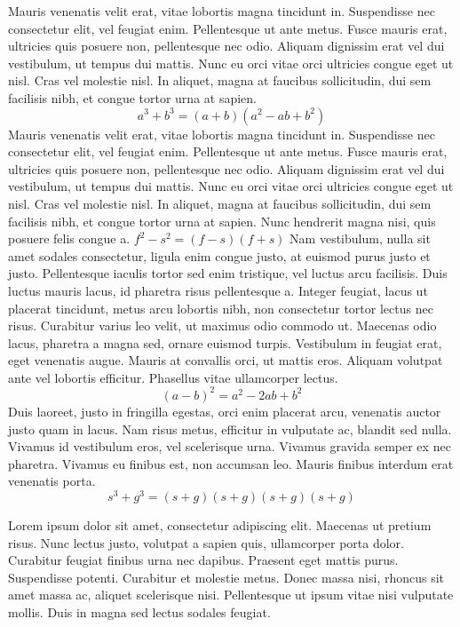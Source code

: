 \documentclass{article}
\begin{document}
Mauris venenatis velit erat, vitae lobortis magna tincidunt in. Suspendisse nec consectetur elit, vel feugiat enim. Pellentesque ut ante metus. Fusce mauris erat, ultricies quis posuere non, pellentesque nec odio. Aliquam dignissim erat vel dui vestibulum, ut tempus dui mattis. Nunc eu orci vitae orci ultricies congue eget ut nisl. Cras vel molestie nisl. In aliquet, magna at faucibus sollicitudin, dui sem facilisis nibh, et congue tortor urna at sapien.
\[ a^{3} + b^{3} = (a+b)(a^{2}-ab+b^{2}) \]
Mauris venenatis velit erat, vitae lobortis magna tincidunt in. Suspendisse nec consectetur elit, vel feugiat enim. Pellentesque ut ante metus. Fusce mauris erat, ultricies quis posuere non, pellentesque nec odio. Aliquam dignissim erat vel dui vestibulum, ut tempus dui mattis. Nunc eu orci vitae orci ultricies congue eget ut nisl. Cras vel molestie nisl. In aliquet, magna at faucibus sollicitudin, dui sem facilisis nibh, et congue tortor urna at sapien.
Nunc hendrerit magna nisi, quis posuere felis congue a.
\begin{math}
    f^{2}-s^{2} = (f - s)(f + s)
\end{math}
Nam vestibulum, nulla sit amet sodales consectetur, ligula enim congue justo, at euismod purus justo et justo. Pellentesque iaculis tortor sed enim tristique, vel luctus arcu facilisis. Duis luctus mauris lacus, id pharetra risus pellentesque a. Integer feugiat, lacus ut placerat tincidunt, metus arcu lobortis nibh, non consectetur tortor lectus nec risus. Curabitur varius leo velit, ut maximus odio commodo ut. Maecenas odio lacus, pharetra a magna sed, ornare euismod turpis. Vestibulum in feugiat erat, eget venenatis augue. Mauris at convallis orci, ut mattis eros. Aliquam volutpat ante vel lobortis efficitur. Phasellus vitae ullamcorper lectus.
\begin{equation}
(a-b)^{2}=a^{2}-2ab+b^{2} 
\end{equation}
Duis laoreet, justo in fringilla egestas, orci enim placerat arcu, venenatis auctor justo quam in lacus. Nam risus metus, efficitur in vulputate ac, blandit sed nulla. Vivamus id vestibulum eros, vel scelerisque urna. Vivamus gravida semper ex nec pharetra. Vivamus eu finibus est, non accumsan leo. Mauris finibus interdum erat venenatis porta. 
\begin{displaymath}
s^{3} + g^{3} = (s+g)(s+g)(s+g)(s+g)
\end{displaymath}

Lorem ipsum dolor sit amet, consectetur adipiscing elit. Maecenas ut pretium risus. Nunc lectus justo, volutpat a sapien quis, ullamcorper porta dolor. Curabitur feugiat finibus urna nec dapibus. Praesent eget mattis purus. Suspendisse potenti. Curabitur et molestie metus. Donec massa nisi, rhoncus sit amet massa ac, aliquet scelerisque nisi. Pellentesque ut ipsum vitae nisi vulputate mollis. Duis in magna sed lectus sodales feugiat.
\end{document}
